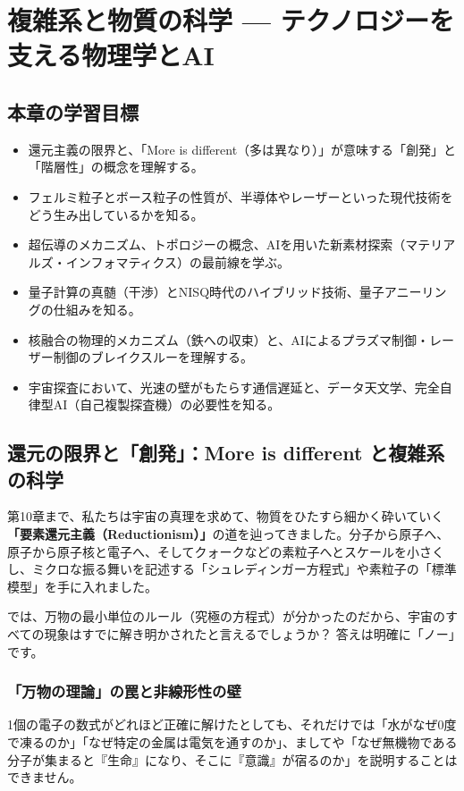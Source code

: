 \chapter{複雑系と物質の科学 --- テクノロジーを支える物理学とAI}

\section*{本章の学習目標}
\begin{itemize}
\item 還元主義の限界と、「More is different（多は異なり）」が意味する「創発」と「階層性」の概念を理解する。
\item フェルミ粒子とボース粒子の性質が、半導体やレーザーといった現代技術をどう生み出しているかを知る。
\item 超伝導のメカニズム、トポロジーの概念、AIを用いた新素材探索（マテリアルズ・インフォマティクス）の最前線を学ぶ。
\item 量子計算の真髄（干渉）とNISQ時代のハイブリッド技術、量子アニーリングの仕組みを知る。
\item 核融合の物理的メカニズム（鉄への収束）と、AIによるプラズマ制御・レーザー制御のブレイクスルーを理解する。
\item 宇宙探査において、光速の壁がもたらす通信遅延と、データ天文学、完全自律型AI（自己複製探査機）の必要性を知る。
\end{itemize}

\section{還元の限界と「創発」：More is different と複雑系の科学}

第10章まで、私たちは宇宙の真理を求めて、物質をひたすら細かく砕いていく\textbf{「要素還元主義（Reductionism）」}の道を辿ってきました。分子から原子へ、原子から原子核と電子へ、そしてクォークなどの素粒子へとスケールを小さくし、ミクロな振る舞いを記述する「シュレディンガー方程式」や素粒子の「標準模型」を手に入れました。

では、万物の最小単位のルール（究極の方程式）が分かったのだから、宇宙のすべての現象はすでに解き明かされたと言えるでしょうか？ 答えは明確に「ノー」です。

\subsection{「万物の理論」の罠と非線形性の壁}

1個の電子の数式がどれほど正確に解けたとしても、それだけでは「水がなぜ0度で凍るのか」「なぜ特定の金属は電気を通すのか」、ましてや「なぜ無機物である分子が集まると『生命』になり、そこに『意識』が宿るのか」を説明することはできません。

